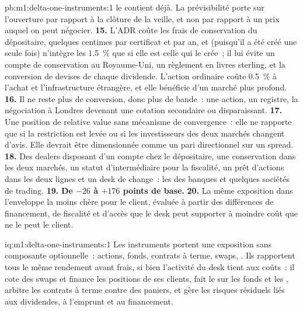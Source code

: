 \begin{solution}{pb:m1:delta-one-instruments:1}
 le contient déjà. La prévisibilité porte sur l'ouverture
par rapport à la clôture de la veille, et non par rapport à un prix auquel
on peut négocier.
\textbf{15.} L'ADR coûte les frais de conservation du dépositaire, quelques centimes par
certificat et par an, et (puisqu'il a été créé une seule fois) n'intègre les 1.5~\% que si
elle est celle qui le crée~; il lui évite un compte de conservation au Royaume-Uni, un règlement
en livres sterling, et la conversion de devises de chaque dividende. L'action ordinaire coûte
0.5~\% à l'achat et l'infrastructure étrangère, et elle bénéficie d'un marché plus profond.
\textbf{16.} Il ne reste plus de conversion, donc plus de bande~: une action, un
registre, la négociation à Londres devenant une cotation secondaire ou disparaissant.
\textbf{17.} Une position de relative value sans mécanisme de convergence~: elle
ne rapporte que si la restriction est levée ou si les investisseurs des deux marchés
changent d'avis. Elle devrait être dimensionnée comme un pari directionnel sur un spread.
\textbf{18.} Des dealers disposant d'un compte chez le dépositaire, une conservation dans les deux
marchés, un statut d'intermédiaire pour la fiscalité, un prêt d'actions dans les deux lignes et un
desk de change~: les  des banques et quelques sociétés de trading.
\textbf{19.} \textbf{De $-26$ à $+176$ points de base.}
\textbf{20.} La même exposition dans l'enveloppe la moins chère pour le
client, évaluée à partir des différences de financement, de fiscalité et d'accès que le desk peut
supporter à moindre coût que ne le peut le client.
\end{solution}

\begin{solution}{iq:m1:delta-one-instruments:1}
Les instruments  portent une exposition sans composante optionnelle~: actions, fonds,
contrats à terme, swaps, . Ils rapportent tous le même rendement avant frais, si bien
l'activité du desk tient aux coûts~: il cote des swaps et finance les
positions de ses clients, fait le  sur les fonds et les , arbitre les contrats à terme contre des paniers,
et gère les risques résiduels liés aux dividendes, à l'emprunt et au financement.
\end{solution}

